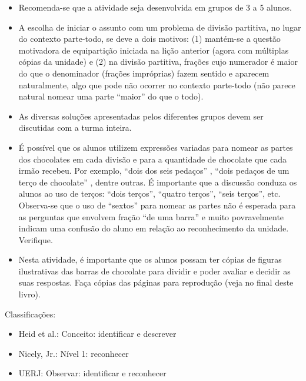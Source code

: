 \begin{multicols}{2}
\begin{itemize} %
    \item       Recomenda-se que a atividade seja desenvolvida em grupos de 3 a 5 alunos.
    \item       A escolha de iniciar o assunto com um problema de divisão partitiva, no lugar do contexto parte-todo, se deve a dois motivos: (1) mantém-se a questão motivadora de equipartição iniciada na lição anterior (agora com múltiplas cópias da unidade) e (2) na divisão partitiva, frações cujo numerador é maior do que o denominador (frações impróprias) fazem sentido e aparecem naturalmente, algo que pode não ocorrer no contexto parte-todo (não parece natural nomear uma parte       ``maior''       do que o todo).
    \item       As diversas soluções apresentadas pelos diferentes grupos devem ser discutidas com a turma inteira.
    \item       É possível que os alunos utilizem expressões variadas para nomear as partes dos chocolates em cada divisão e para a quantidade de chocolate que cada irmão recebeu. Por exemplo,       ``dois dos seis pedaços''      ,       ``dois pedaços de um terço de chocolate''      , dentre outras. É importante que a discussão conduza os alunos ao uso de terços:       ``dois terços'',       ``quatro terços'',       ``seis terços'', etc. Observa-se que o uso de       ``sextos''       para nomear as partes não é esperada para as perguntas que envolvem fração       ``de uma barra''       e muito povravelmente indicam uma confusão do aluno em relação ao reconhecimento da unidade. Verifique.
    \item       Nesta atividade, é importante que os alunos possam ter cópias de figuras ilustrativas das barras de chocolate para dividir e poder avaliar e decidir as suas respostas. Faça cópias das páginas para reprodução (veja no final deste livro).
\end{itemize} %


  Classificações:
\begin{itemize} %
    \item       Heid et al.: Conceito: identificar e descrever
    \item       Nicely, Jr.: Nível 1: reconhecer
    \item       UERJ: Observar: identificar e reconhecer
\end{itemize} %


\end{multicols}
